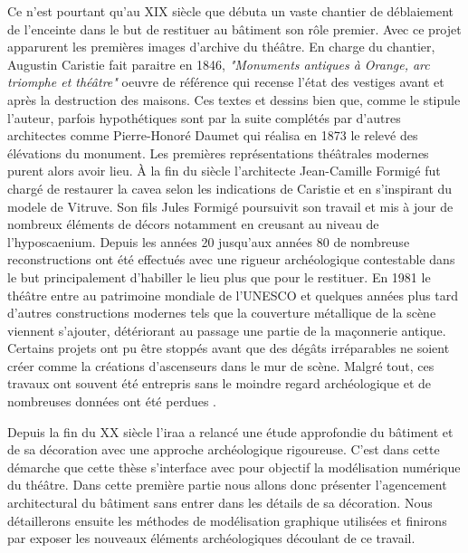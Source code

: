 			 Ce n'est pourtant qu'au XIX siècle que débuta un vaste chantier de déblaiement de l'enceinte dans le but de restituer au bâtiment son rôle premier. Avec ce projet apparurent les premières images d'archive du théâtre. En charge du chantier, Augustin Caristie fait paraitre en 1846, \textit{"Monuments antiques à Orange, arc triomphe et théâtre"} oeuvre de référence qui recense l'état des vestiges avant et après la destruction des maisons. Ces textes et dessins bien que, comme le stipule l'auteur, parfois hypothétiques sont par la suite complétés par d'autres architectes comme Pierre-Honoré Daumet qui réalisa en 1873 le relevé des élévations du monument. Les premières représentations théâtrales modernes purent alors avoir lieu. \`{A} la fin du siècle l'architecte Jean-Camille Formigé fut chargé de restaurer la cavea selon les indications de Caristie et en s'inspirant du modele de Vitruve. Son fils Jules Formigé poursuivit son travail et mis à jour de nombreux éléments de décors notamment en creusant au niveau de l'\gls{hyposcaenium}. Depuis les années 20 jusqu'aux années 80 de nombreuse reconstructions ont été effectués avec une rigueur archéologique contestable dans le but principalement d'habiller le lieu plus que pour le restituer. En 1981 le théâtre entre au patrimoine mondiale de l'UNESCO et quelques années plus tard d'autres constructions modernes tels que la couverture métallique de la scène viennent s'ajouter, détériorant au passage une partie de la maçonnerie antique. Certains projets ont pu être stoppés avant que des dégâts irréparables ne soient créer comme la créations d'ascenseurs dans le mur de scène. Malgré tout, ces travaux ont souvent été entrepris sans le moindre regard archéologique et de nombreuses données ont été perdues \citep{carteArcheo}.
			 
			 Depuis la fin du XX siècle l'\gls{iraa} a relancé une étude approfondie du bâtiment et de sa décoration avec une approche archéologique rigoureuse. C'est dans cette démarche que cette thèse s'interface avec pour objectif la modélisation numérique du théâtre. Dans cette première partie nous allons donc présenter l'agencement architectural du bâtiment sans entrer dans les détails de sa décoration. Nous détaillerons ensuite les méthodes de modélisation graphique utilisées et finirons par exposer les nouveaux éléments archéologiques découlant de ce travail.
			 
